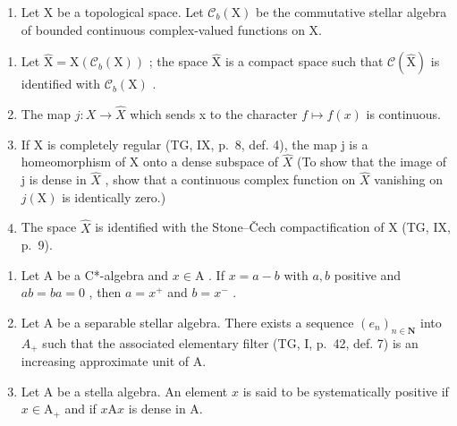 \begin{enumerate}
\def\labelenumi{\arabic{enumi})}
\setcounter{enumi}{15}
\tightlist
\item
  Let X be a topological space. Let \(\mathcal{C}_{b}(\mathrm{X})\) be the commutative stellar algebra of bounded continuous complex-valued functions on X.
\end{enumerate}

\begin{enumerate}
\def\labelenumi{\alph{enumi})}
\item
  Let \(\widehat{\mathrm{X}} = \mathrm{X}(\mathcal{C}_b(\mathrm{X}))\) ; the space \(\widehat{\mathrm{X}}\) is a compact space such that \(\mathcal{C}(\widehat{\mathrm{X}})\) is identified with \(\mathcal{C}_b(\mathrm{X})\) .
\item
  The map \(j: X \to \widehat{X}\) which sends x to the character \(f \mapsto f(x)\) is continuous.
\item
  If X is completely regular (TG, IX, p.~8, def. 4), the map j is a homeomorphism of X onto a dense subspace of \(\widehat{X}\) (To show that the image of j is dense in \(\widehat{X}\) , show that a continuous complex function on \(\widehat{X}\) vanishing on \(j(\mathrm{X})\) is identically zero.)
\item
  The space \(\widehat{X}\) is identified with the Stone–Čech compactification of X (TG, IX, p.~9).
\end{enumerate}

\begin{enumerate}
\def\labelenumi{\arabic{enumi})}
\setcounter{enumi}{16}
\item
  Let A be a C*-algebra and \(x \in \mathrm{A}\) . If \(x = a - b\) with \(a, b\) positive and \(ab = ba = 0\) , then \(a = x^{+}\) and \(b = x^{-}\) .
\item
  Let A be a separable stellar algebra. There exists a sequence \((e_{n})_{n\in\mathbf{N}}\) into \(A_{+}\) such that the associated elementary filter (TG, I, p.~42, def. 7) is an increasing approximate unit of A.
\item
  Let A be a stella algebra. An element \(x\) is said to be systematically positive if \(x \in \mathrm{A}_{+}\) and if \(x\mathrm{A}x\) is dense in A.
\end{enumerate}

